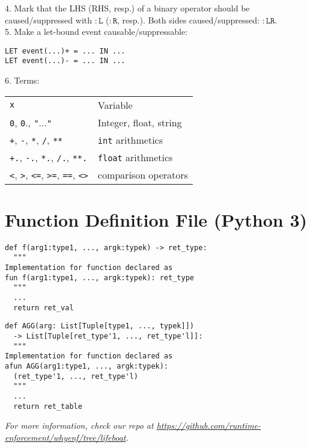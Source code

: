 \documentclass[a4paper,9pt]{extarticle}
\begin{document}
\begin{multicols}{2}
\begin{tcolorbox}
  4. Mark that the LHS (RHS, resp.) of a binary operator should be caused/suppressed
  with $\mathtt{:L}$ ($\mathtt{:R}$, resp.). Both sides caused/suppressed: $\mathtt{:LR}$.\\[5pt]
  5. Make a let-bound event causable/suppressable:
\begin{verbatim}
LET event(...)+ = ... IN ...
LET event(...)- = ... IN ...
\end{verbatim}
  6. Terms:\\
  \begin{tabular}{ll}
    \texttt{x} & Variable \\
    \texttt{0}, \texttt{0}., \texttt{"}...\texttt{"} & Integer, float, string \\
    \texttt{+}, \texttt{-}, \texttt{*}, \texttt{/}, \texttt{**} & \texttt{int} arithmetics \\
    \texttt{+.}, \texttt{-.}, \texttt{*.}, \texttt{/.}, \texttt{**.} & \texttt{float} arithmetics \\
    \texttt{<}, \texttt{>}, \texttt{<=}, \texttt{>=}, \texttt{==}, \texttt{<>}& comparison operators 
  \end{tabular}
\end{tcolorbox}

\section{Function Definition File (Python 3)}
\begin{tcolorbox}
\begin{verbatim}
def f(arg1:type1, ..., argk:typek) -> ret_type:
  """ 
Implementation for function declared as
fun f(arg1:type1, ..., argk:typek): ret_type
  """
  ...
  return ret_val
\end{verbatim}
\begin{verbatim}
def AGG(arg: List[Tuple[type1, ..., typek]])
  -> List[Tuple[ret_type'1, ..., ret_type'l]]:
  """ 
Implementation for function declared as
afun AGG(arg1:type1, ..., argk:typek): 
  (ret_type'1, ..., ret_type'l)
  """
  ...
  return ret_table
\end{verbatim}
\end{tcolorbox}

\end{multicols}

\vspace{0.5em}
\begin{center}
    \textit{For more information, check our repo at \url{https://github.com/runtime-enforcement/whyenf/tree/lifeboat}.}
\end{center}
\end{document}

